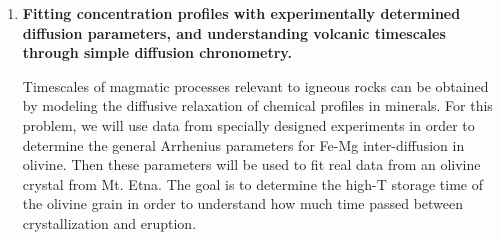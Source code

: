 \documentclass{template}
\begin{document}
\begin{enumerate}[label=\textbf{\arabic*.}]
\begin{enumerate}[label=\Alph*)]
{    \begin{align*}
        dV_S &= dT \cdot \frac{dV_S}{dT}\\
        &= \qty{629}{\celsius} \cdot \qty{0.45}{m\per\s\per\kelvin}\\
        &\approx \qty{283}{\m\per\s}
    \end{align*}

    Using the seismic velocities provided for peridotite in question 2:

    \begin{align*}
        \frac{dV_P}{V_P} &= \qty{377}{\m\per\s} / \qty{8300}{\m\per\s} \cdot 100\\
        &= 4.55\%
    \end{align*}

    \begin{align*}
        \frac{dV_S}{V_S} &= \qty{283}{\m\per\s} / \qty{4730}{\m\per\s} \cdot 100\\
        &= 5.98\%
    \end{align*}

    Given that these values are at the very low end of the observed velocity anomaly range for cratonic roots, it is unlikely that they can be solely attributed to cooling.
}
\end{enumerate}

\item \textbf{Fitting concentration profiles with experimentally determined diffusion parameters, and understanding volcanic timescales through simple diffusion chronometry.}

Timescales of magmatic processes relevant to igneous rocks can be obtained by modeling the diffusive relaxation of chemical profiles in minerals. For this problem, we will use data from specially designed experiments in order to determine the general Arrhenius parameters for Fe-Mg inter-diffusion in olivine. Then these parameters will be used to fit real data from an olivine crystal from Mt. Etna. The goal is to determine the high-T storage time of the olivine grain in order to understand how much time passed between crystallization and eruption.

\begin{enumerate}[label=\textit{Part \arabic*:}, leftmargin=*]


\end{enumerate}
\end{enumerate}
\end{document}

